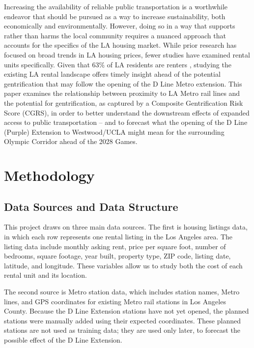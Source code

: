 \documentclass[11pt]{article}
\begin{document}
Increasing the availability of reliable public transportation is a worthwhile endeavor that should be pursued as a way to increase sustainability, both economically and environmentally. However, doing so in a way that supports rather than harms the local community requires a nuanced approach that accounts for the specifics of the LA housing market. While prior research has focused on broad trends in LA housing prices, fewer studies have examined rental units specifically. Given that 63\% of LA residents are renters \citep{ofarrell2022motion}, studying the existing LA rental landscape offers timely insight ahead of the potential gentrification that may follow the opening of the D Line Metro extension. This paper examines the relationship between proximity to LA Metro rail lines and the potential for gentrification, as captured by a Composite Gentrification Risk Score (CGRS), in order to better understand the downstream effects of expanded access to public transportation -- and to forecast what the opening of the D Line (Purple) Extension to Westwood/UCLA might mean for the surrounding Olympic Corridor ahead of the 2028 Games.

\section{Methodology}

\subsection{Data Sources and Data Structure}

This project draws on three main data sources. The first is housing listings data, in which each row represents one rental listing in the Los Angeles area. The listing data include monthly asking rent, price per square foot, number of bedrooms, square footage, year built, property type, ZIP code, listing date, latitude, and longitude. These variables allow us to study both the cost of each rental unit and its location.

The second source is Metro station data, which includes station names, Metro lines, and GPS coordinates for existing Metro rail stations in Los Angeles County. Because the D Line Extension stations have not yet opened, the planned stations were manually added using their expected coordinates. These planned stations are not used as training data; they are used only later, to forecast the possible effect of the D Line Extension.
\end{document}
